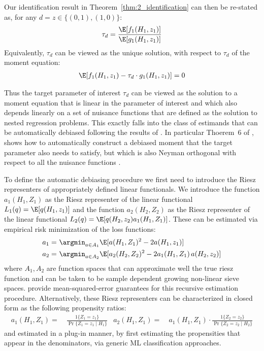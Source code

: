 Our identification result in Theorem~\ref{thm:2_identification} can then be re-stated as, for any $d=z\in \{(0,1), (1,0)\}$:
\begin{align*}
    \tau_d = \frac{\E[f_1(H_1, z_1)]}{\E[g_1(H_1, z_1)]}
\end{align*}
Equivalently, $\tau_d$ can be viewed as the unique solution, with respect to $\tau_d$ of the moment equation:
\begin{align*}
    \E[f_1(H_1, z_1) - \tau_d \cdot g_1(H_1, z_1)] = 0 
\end{align*}

Thus the target parameter of interest $\tau_d$ can be viewed as the solution to a moment equation that is linear in the parameter of interest and which also depends linearly on a set of nuisance functions that are defined as the solution to nested regression problems. This exactly falls into the class of estimands that can be automatically debiased following the results of \cite{chernozhukov2022automatic}. In particular Thoerem~6 of \cite{chernozhukov2022automatic}, shows how to automatically construct a debiased moment that the target parameter also needs to satisfy, but which is also Neyman orthogonal with respect to all the nuisance functions \citep{chernozhukov2018double}. 

To define the automatic debiasing procedure we first need to introduce the Riesz representers of appropriately defined linear functionals. We introduce the function $a_1(H_1, Z_1)$ as the Riesz representer of the linear functional $L_1(q)=\E[q(H_1, z_1)]$ and the function $a_2(H_2, Z_2)$ as the Riesz representer of the linear functional $L_2(q)=\E[q(H_2, z_2) a_1(H_1, Z_1)]$. These can be estimated via empirical risk minimization of the loss functions:
\begin{equation}\label{eqn:riesz}
\begin{aligned}
    a_1 =~& \argmin_{a\in A_1} \E[a(H_1, Z_1)^2 - 2a(H_1, z_1)]\\
    a_2 =~& \argmin_{a\in A_2} \E[a_2(H_2, Z_2)^2 - 2 a_1(H_1, Z_1)\,a(H_2, z_2)]
\end{aligned}
\end{equation}
where $A_1, A_2$ are function spaces that can approximate well the true riesz function and can be taken to be sample dependent growing non-linear sieve spaces. \cite{chernozhukov2022automatic} provide mean-squared-error guarantees for this recursive estimation procedure. Alternatively, these Riesz representers can be characterized in closed form as the following propensity ratios:
\begin{align}
    a_1(H_1, Z_1) =~& \frac{1\{Z_1=z_1\}}{\Pr\{Z_1=z_1\mid H_1\}} &
    a_2(H_1, Z_1) =~& a_1(H_1, Z_1) \cdot \frac{1\{Z_2=z_2\}}{\Pr\{Z_2=z_2\mid H_2\}} 
\end{align}
and estimated in a plug-in manner, by first estimating the propensities that appear in the denominators, via generic ML classification approaches.

